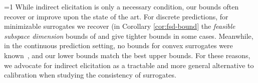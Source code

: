 \documentclass{article}
\newcommand{\Comments}{1}
\newcommand{\mynote}[2]{\ifnum\Comments=1\textcolor{#1}{#2}\fi}
\newcommand{\mytodo}[2]{\ifnum\Comments=1%
	\todo[linecolor=#1!80!black,backgroundcolor=#1,bordercolor=#1!80!black]{#2}\fi}
\newcommand{\raf}[1]{\mynote{green!80!blue}{[RF: #1]}}
\newcommand{\raft}[1]{\mytodo{green!20!white}{RF: #1}}
\newcommand{\jessiet}[1]{\mytodo{purple!20!white}{JF: #1}}
\newcommand{\btw}[1]{\mytodo{gray!10!white}{\textcolor{gray}{BTW: #1}}}%
\newcommand{\reals}{\mathbb{R}}
\newcommand{\Y}{\mathcal{Y}}
\begin{document}
\btw{Bo: modified this last paragraph a bit}
While indirect elicitation is only a necessary condition, our bounds often recover or improve upon the state of the art.
For discrete predictions, for minimizable surrogates we recover (in Corollary \ref{cor:fsd-bound} the \emph{feasible subspace dimension} bounds of \citet{ramaswamy2016convex} and give tighter bounds in some cases.
Meanwhile, in the continuous prediction setting, no bounds for convex surrogates were known~\citep{frongillo2018elicitation}, and our lower bounds match the best upper bounds.
For these reasons, we advocate for indirect elicitation as a tractable and more general alternative to calibration when studying the consistency of surrogates.


\end{document}
